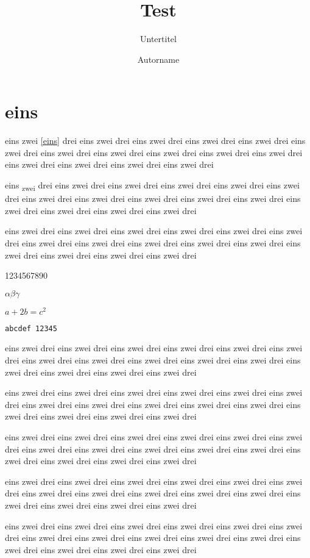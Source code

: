 \documentclass[ngerman]{scrartcl}
\title{Test}
\subtitle{Untertitel} %
\author{Autorname} %
\begin{document}
	\maketitle

	\section{eins}\label{eins}

	eins zwei \autoref{eins} drei eins zwei drei eins zwei drei eins zwei drei eins zwei drei
	eins zwei drei eins zwei drei eins zwei drei eins zwei drei eins zwei drei
	eins zwei drei eins zwei drei eins zwei drei eins zwei drei eins zwei drei

	eins \textsubscript{zwei} drei eins zwei drei eins zwei drei eins zwei drei eins zwei drei
	eins zwei drei eins zwei drei eins zwei drei eins zwei drei eins zwei drei
	eins zwei drei eins zwei drei eins zwei drei eins zwei drei eins zwei drei

	eins zwei drei eins zwei drei eins zwei drei eins zwei drei eins zwei drei
	eins zwei drei eins zwei drei eins zwei drei eins zwei drei eins zwei drei
	eins zwei drei eins zwei drei eins zwei drei eins zwei drei eins zwei drei

	1234567890

	$\alpha \beta \gamma$

	$a+2b=c^2$

	\texttt{abcdef 12345}

	eins zwei drei eins zwei drei eins zwei drei eins zwei drei eins zwei drei
	eins zwei drei eins zwei drei eins zwei drei eins zwei drei eins zwei drei
	eins zwei drei eins zwei drei eins zwei drei eins zwei drei eins zwei drei

	eins zwei drei eins zwei drei eins zwei drei eins zwei drei eins zwei drei
	eins zwei drei eins zwei drei eins zwei drei eins zwei drei eins zwei drei
	eins zwei drei eins zwei drei eins zwei drei eins zwei drei eins zwei drei

	eins zwei drei eins zwei drei eins zwei drei eins zwei drei eins zwei drei
	eins zwei drei eins zwei drei eins zwei drei eins zwei drei eins zwei drei
	eins zwei drei eins zwei drei eins zwei drei eins zwei drei eins zwei drei

	eins zwei drei eins zwei drei eins zwei drei eins zwei drei eins zwei drei
	eins zwei drei eins zwei drei eins zwei drei eins zwei drei eins zwei drei
	eins zwei drei eins zwei drei eins zwei drei eins zwei drei eins zwei drei

	eins zwei drei eins zwei drei eins zwei drei eins zwei drei eins zwei drei
	eins zwei drei eins zwei drei eins zwei drei eins zwei drei eins zwei drei
	eins zwei drei eins zwei drei eins zwei drei eins zwei drei eins zwei drei

\end{document}
